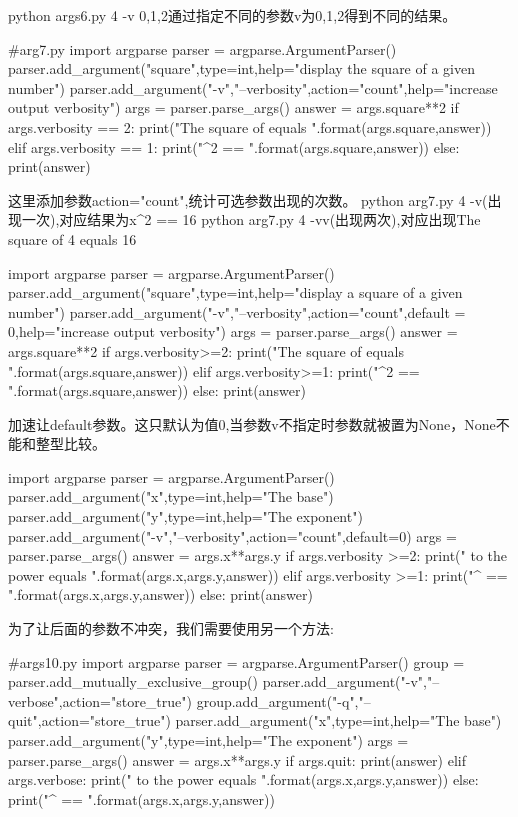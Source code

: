 python args6.py 4 -v 0,1,2通过指定不同的参数v为0,1,2得到不同的结果。
\begin{python}
#arg7.py
import argparse
parser = argparse.ArgumentParser()
parser.add_argument("square",type=int,help="display the square of a given number")
parser.add_argument("-v","--verbosity",action="count",help="increase output verbosity")
args = parser.parse_args()
answer = args.square**2
if args.verbosity == 2:
    print("The square of {} equals {}".format(args.square,answer))
elif args.verbosity == 1:
    print("{}^2 == {}".format(args.square,answer))
else:
    print(answer)
\end{python}
这里添加参数action="count",统计可选参数出现的次数。
python arg7.py 4 -v(出现一次),对应结果为x\^{}2 == 16\newline
python arg7.py 4 -vv(出现两次),对应出现The square of 4 equals 16\newline
\begin{python}
import argparse
parser = argparse.ArgumentParser()
parser.add_argument("square",type=int,help="display a square of a given number")
parser.add_argument("-v","--verbosity",action="count",default = 0,help="increase output verbosity")
args = parser.parse_args()
answer = args.square**2
if args.verbosity>=2:
    print("The square of {} equals {}".format(args.square,answer))
elif args.verbosity>=1:
    print("{}^2 == {}".format(args.square,answer))
else:
    print(answer)
\end{python}
加速让default参数。这只默认为值0,当参数v不指定时参数就被置为None，None不能和整型比较。
\begin{python}
import argparse
parser = argparse.ArgumentParser()
parser.add_argument("x",type=int,help="The base")
parser.add_argument("y",type=int,help="The exponent")
parser.add_argument("-v","--verbosity",action="count",default=0)
args = parser.parse_args()
answer = args.x**args.y
if args.verbosity >=2:
    print("{} to the power {} equals {}".format(args.x,args.y,answer))
elif args.verbosity >=1:
    print("{}^{} == {}".format(args.x,args.y,answer))
else:
    print(answer)
\end{python}
为了让后面的参数不冲突，我们需要使用另一个方法:
\begin{python}
#args10.py
import argparse
parser = argparse.ArgumentParser()
group = parser.add_mutually_exclusive_group()
parser.add_argument("-v","--verbose",action="store_true")
group.add_argument("-q","--quit",action="store_true")
parser.add_argument("x",type=int,help="The base")
parser.add_argument("y",type=int,help="The exponent")
args = parser.parse_args()
answer = args.x**args.y
if args.quit:
    print(answer)
elif args.verbose:
    print("{} to the power {} equals {}".format(args.x,args.y,answer))
else:
    print("{}^{} == {}".format(args.x,args.y,answer))
\end{python}

